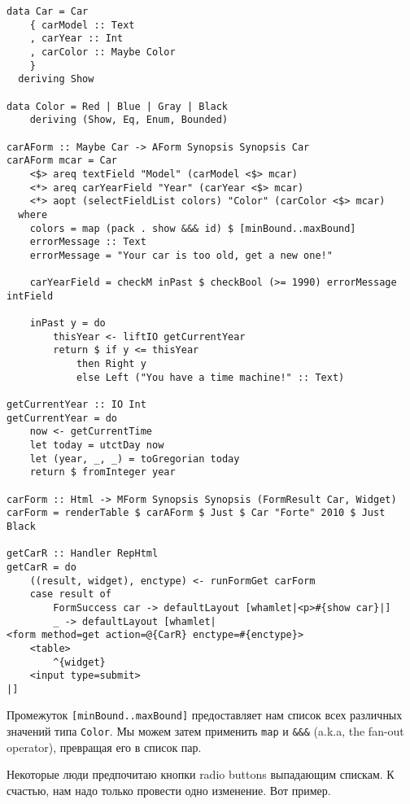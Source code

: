 \begin{lstlisting}[caption={Используя Enum и Bounded}]
data Car = Car
    { carModel :: Text
    , carYear :: Int
    , carColor :: Maybe Color
    }
  deriving Show

data Color = Red | Blue | Gray | Black
    deriving (Show, Eq, Enum, Bounded)

carAForm :: Maybe Car -> AForm Synopsis Synopsis Car
carAForm mcar = Car
    <$> areq textField "Model" (carModel <$> mcar)
    <*> areq carYearField "Year" (carYear <$> mcar)
    <*> aopt (selectFieldList colors) "Color" (carColor <$> mcar)
  where
    colors = map (pack . show &&& id) $ [minBound..maxBound]
    errorMessage :: Text
    errorMessage = "Your car is too old, get a new one!"

    carYearField = checkM inPast $ checkBool (>= 1990) errorMessage intField

    inPast y = do
        thisYear <- liftIO getCurrentYear
        return $ if y <= thisYear
            then Right y
            else Left ("You have a time machine!" :: Text)

getCurrentYear :: IO Int
getCurrentYear = do
    now <- getCurrentTime
    let today = utctDay now
    let (year, _, _) = toGregorian today
    return $ fromInteger year

carForm :: Html -> MForm Synopsis Synopsis (FormResult Car, Widget)
carForm = renderTable $ carAForm $ Just $ Car "Forte" 2010 $ Just Black

getCarR :: Handler RepHtml
getCarR = do
    ((result, widget), enctype) <- runFormGet carForm
    case result of
        FormSuccess car -> defaultLayout [whamlet|<p>#{show car}|]
        _ -> defaultLayout [whamlet|
<form method=get action=@{CarR} enctype=#{enctype}>
    <table>
        ^{widget}
    <input type=submit>
|]
\end{lstlisting}

Промежуток \lstinline'[minBound..maxBound]' предоставляет нам список всех различных
значений типа \lstinline'Color'. Мы можем затем применить \lstinline'map' и 
\lstinline'&&&' (a.k.a, the fan-out operator), превращая его в список пар.

Некоторые люди предпочитаю кнопки radio buttons 
выпадающим спискам. К счастью, нам надо только провести одно изменение. Вот пример.


